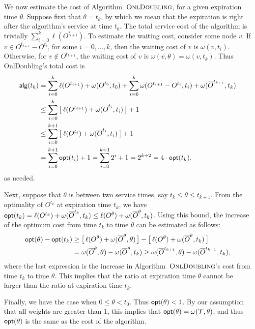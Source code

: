 \documentclass[a4paper]{article}
\newcommand{\barO}{\overline{O}}
\newcommand{\calT}{{\cal T}}
\newcommand{\opt}{\mbox{\rm\textsf{opt}}}
\newcommand{\alg}{\mbox{\rm\textsf{alg}}}
\newcommand{\length}{\ell}
\newcommand{\algDoubling}{\mbox{\sc OnlDoubling}}
\newcommand{\expiration}{\theta}
\begin{document}
We now estimate the cost of Algorithm~$\algDoubling$, for a given expiration time $\expiration$.
Suppose first that $\expiration = t_k$, by which we mean that the expiration is right after the algorithm's service at 
time $t_k$. The total service cost of the algorithm is trivially $\sum_{i=0}^{k} \length(O^{t_{i+1}})$.
To estimate the waiting cost, consider some node $v$. If $v\in O^{t_{i+1}}-O^{t_i}$, for some $i = 0,...,k$, then
the waiting cost of $v$ is $\omega(v,t_i)$. Otherwise, for $v\notin O^{t_{k+1}}$, the waiting cost of $v$
is $\omega(v,\theta) = \omega(v,t_k)$.
Thus {\algDoubling}'s total cost is
\begin{align*}
		\alg(t_k) &= 		\sum_{i=0}^{k} \length(O^{t_{i+1}})
		+  \omega(O^{t_0},t_0) + \sum_{i=0}^{k} \omega(O^{t_{i+1}}-O^{t_i} , t_i) + \omega(\barO^{t_{k+1}},t_k) 
		\\
		&\le	\sum_{i=0}^{k} \big[\, \length(O^{t_{i+1}})	+  \omega(\barO^{t_i},t_i) \,\big] + 1
		\\
		&\le	\sum_{i=0}^{k+1} \big[\, \length(O^{t_{i}})	+  \omega(\barO^{t_i},t_i) \,\big] + 1
		\\
		&=  \sum_{i=0}^{k+1} \opt(t_i) + 1 = \sum_{i=0}^{k+1} 2^i + 1
						= 2^{k+2} = 4\cdot\opt(t_k),
	\end{align*}
as needed. 

Next, suppose that $\expiration$ is between two service times, say $t_k\le \expiration \le t_{k+1}$.
From the optimality of $O^{t_k}$ at expiration time $t_k$, we have
$\opt(t_k)= \length(O^{t_k}) + \omega(\barO^{t_k},t_k) 
			\le \length(O^\expiration) + \omega(\barO^\expiration,t_k)$.
Using this bound,
the increase of the optimum cost from time $t_k$ to time $\expiration$ can be estimated 
as follows:
\begin{align*}
	\opt(\expiration) - \opt(t_k) &\ge	
							\big[\, \length(O^\expiration) + \omega(\barO^\expiration,\expiration) \,\big]
		   					- \big[\, \length(O^\expiration) + \omega(\barO^\expiration,t_k) \,\big]
		\\
		&=  \omega(\barO^\expiration,\expiration) - \omega(\barO^\expiration,t_k)
		\ge  \omega(\barO^{t_{k+1}},\expiration) - \omega(\barO^{t_{k+1}},t_k),
\end{align*}
where the last expression is the increase in Algorithm~$\algDoubling$'s cost from time
$t_k$ to time $\expiration$. This implies that the ratio at expiration time $\expiration$ cannot be larger than the
ratio at expiration time $t_k$.

Finally, we have the case when $0 \le \expiration < t_0$. Thus $\opt(\expiration) < 1$. By our assumption that all
weights are greater than $1$, this implies that $\opt(\expiration) = \omega(\calT,\expiration)$, and thus
$\opt(\expiration)$ is the same as the cost of the algorithm.
\end{document}
